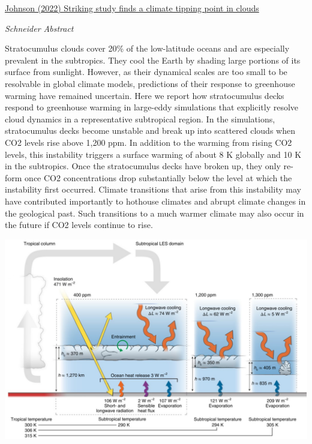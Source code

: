 \documentclass[
]{book}
\begin{document}
\href{https://arstechnica.com/science/2019/02/striking-study-finds-a-climate-tipping-point-in-clouds/}{Johnson (2022) Striking study finds a climate tipping point in clouds}

\emph{Schneider Abstract}

Stratocumulus clouds cover 20\% of the low-latitude oceans and are especially prevalent in the subtropics. They cool the Earth by shading large portions of its surface from sunlight. However, as their dynamical scales are too small to be resolvable in global climate models, predictions of their response to greenhouse warming have remained uncertain. Here we report how stratocumulus decks respond to greenhouse warming in large-eddy simulations that explicitly resolve cloud dynamics in a representative subtropical region. In the simulations, stratocumulus decks become unstable and break up into scattered clouds when CO2 levels rise above 1,200 ppm. In addition to the warming from rising CO2 levels, this instability triggers a surface warming of about 8 K globally and 10 K in the subtropics. Once the stratocumulus decks have broken up, they only re-form once CO2 concentrations drop substantially below the level at which the instability first occurred. Climate transitions that arise from this instability may have contributed importantly to hothouse climates and abrupt climate changes in the geological past. Such transitions to a much warmer climate may also occur in the future if CO2 levels continue to rise.

\includegraphics{fig/cloud_deck_breakup_at_1200ppm.jpg}
\end{document}
